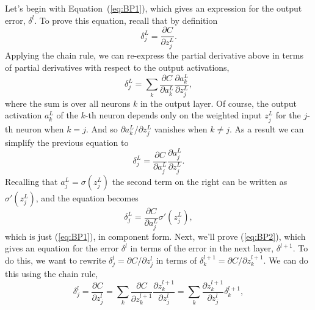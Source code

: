 \documentclass[a4paper,twoside,10pt]{book}
\begin{document}
Let's begin with Equation~(\ref{eq:BP1}), which gives an expression for the output error, $\delta^l$. To prove this equation, recall that by definition
\begin{equation}
	\delta^L_j = \frac{\partial C}{\partial z^L_j}.
	\tag{36}\label{eq:36}
\end{equation}
Applying the chain rule, we can re-express the partial derivative above in terms of partial derivatives with respect to the output activations,
\begin{equation}
	\delta^L_j = \sum_k \frac{\partial C}{\partial a^L_k} \frac{\partial a^L_k}{\partial z^L_j},
	\tag{37}\label{eq:37}
\end{equation}%
where the sum is over all neurons $k$ in the output layer. Of course, the output activation $a^L_k$ of the $k$-th neuron depends only on the weighted input $z^L_j$ for the $j$-th neuron when $k=j$. And so $\partial{}a^L_k/\partial{}z^L_j$ vanishes when $k\ne{}j$. As a result we can simplify the previous equation to
\begin{equation}
	\delta^L_j = \frac{\partial C}{\partial a^L_j} \frac{\partial a^L_j}{\partial z^L_j}.
	\tag{38}\label{eq:38}
\end{equation}%
Recalling that $a^L_j=\sigma(z^L_j)$ the second term on the right can be written as $\sigma'(z^L_j)$, and the equation becomes
\begin{equation}
	\delta^L_j = \frac{\partial C}{\partial a^L_j} \sigma'(z^L_j),
	\tag{39}\label{eq:39}
\end{equation}
which is just (\ref{eq:BP1}), in component form.
%
Next, we'll prove (\ref{eq:BP2}), which gives an equation for the error $\delta^l$ in terms of the error in the next layer, $\delta^{l+1}$. To do this, we want to rewrite $\delta^l_j=\partial{}C/\partial{}z^l_j$ in terms of $\delta^{l+1}_k=\partial{}C/\partial{}z^{l+1}_k$. We can do this using the chain rule,
\begin{equation}
\delta^l_j =  \frac{\partial C}{\partial z^l_j} =  \sum_k \frac{\partial C}{\partial z^{l+1}_k} \frac{\partial z^{l+1}_k}{\partial z^l_j} = \sum_k \frac{\partial z^{l+1}_k}{\partial z^l_j} \delta^{l+1}_k,
\tag{42}\label{eq:42}
\end{equation}
\end{document}
